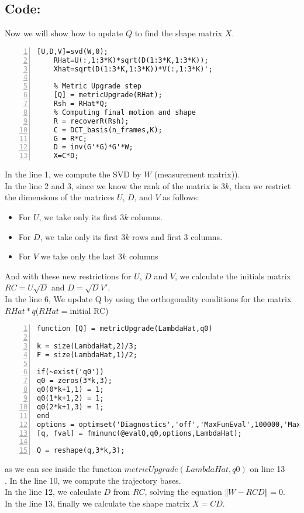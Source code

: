 \subsection{Code:}
\noindent Now we will show how to update $Q$ to find the shape matrix $X$.
\begin{lstlisting}[style=Matlab-editor, numbers=left]
	[U,D,V]=svd(W,0);
	RHat=U(:,1:3*K)*sqrt(D(1:3*K,1:3*K));
	Xhat=sqrt(D(1:3*K,1:3*K))*V(:,1:3*K)';    
	
	% Metric Upgrade step
	[Q] = metricUpgrade(RHat);
	Rsh = RHat*Q;
	% Computing final motion and shape
	R = recoverR(Rsh);
	C = DCT_basis(n_frames,K);
	G = R*C;
	D = inv(G'*G)*G'*W;
	X=C*D;
\end{lstlisting}
\noindent In the line 1, we compute the SVD by $W$ (measurement matrix)).\\
\noindent In the line 2 and 3, since we know the rank of the matrix is $3k$, then we restrict the dimensions of the matrices $U$, $D$, and $V$ as follows:
\begin{itemize}
	\item For $U$, we take only its first $3k$ columns.
	\item For $D$, we take only its first $3k$ rows and first 3 columns.
	\item For $V$ we take only the last $3k$ columns
\end{itemize}
\noindent And with these new restrictions for $U$, $D$ and $V$, we calculate the initials matrix $RC=U\sqrt{D}$ and $D=\sqrt{D}V'$.\\
\noindent In the line 6, We update Q by using the orthogonality conditions for the matrix $RHat*q$($RHat=$initial RC)
\begin{lstlisting}[style=Matlab-editor, numbers=left]
function [Q] = metricUpgrade(LambdaHat,q0)

k = size(LambdaHat,2)/3;
F = size(LambdaHat,1)/2;

if(~exist('q0'))
q0 = zeros(3*k,3);
q0(0*k+1,1) = 1;
q0(1*k+1,2) = 1;
q0(2*k+1,3) = 1;
end
options = optimset('Diagnostics','off','MaxFunEval',100000,'MaxIter',2000,'TolFun',1e-10,'TolX',1e-10);
[q, fval] = fminunc(@evalQ,q0,options,LambdaHat); 

Q = reshape(q,3*k,3);
\end{lstlisting}
as we can see inside the function $metricUpgrade(LambdaHat,q0)$ on line 13\\.
\noindent In the line 10, we compute the trajectory bases.\\
\noindent In the line 12, we calculate $D$ from $RC$, solving the equation $\Vert W-RCD\Vert =0$.\\
\noindent In the line 13, finally we calculate the shape matrix $X=CD$.\\
